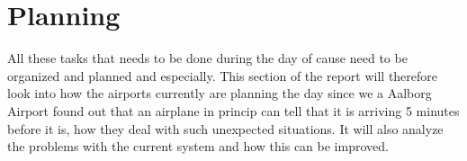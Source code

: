 \section{Planning}
All these tasks that needs to be done during the day of cause need to be organized and planned and especially. This section of the report will therefore look into how the airports currently are planning the day since we a Aalborg Airport found out that an airplane in princip can tell that it is arriving 5 minutes before it is, how they deal with such unexpected situations.
It will also analyze the problems with the current system and how this can be improved.